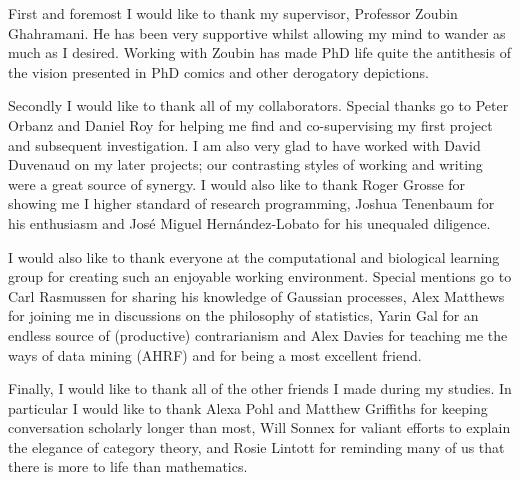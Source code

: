 
\begin{acknowledgements}      

First and foremost I would like to thank my supervisor, Professor Zoubin Ghahramani.
He has been very supportive whilst allowing my mind to wander as much as I desired.
Working with Zoubin has made PhD life quite the antithesis of the vision presented in PhD comics and other derogatory depictions.

Secondly I would like to thank all of my collaborators.
Special thanks go to Peter Orbanz and Daniel Roy for helping me find and co-supervising my first project and subsequent investigation.
I am also very glad to have worked with David Duvenaud on my later projects; our contrasting styles of working and writing were a great source of synergy.
I would also like to thank Roger Grosse for showing me I higher standard of research programming, Joshua Tenenbaum for his enthusiasm and Jos\'{e} Miguel Hern\'{a}ndez-Lobato for his unequaled diligence.

I would also like to thank everyone at the computational and biological learning group for creating such an enjoyable working environment.
Special mentions go to Carl Rasmussen for sharing his knowledge of Gaussian processes, Alex Matthews for joining me in discussions on the philosophy of statistics, Yarin Gal for an endless source of (productive) contrarianism and Alex Davies for teaching me the ways of data mining (AHRF) and for being a most excellent friend.

Finally, I would like to thank all of the other friends I made during my studies.
In particular I would like to thank Alexa Pohl and Matthew Griffiths for keeping conversation scholarly longer than most, Will Sonnex for valiant efforts to explain the elegance of category theory, and Rosie Lintott for reminding many of us that there is more to life than mathematics.

\end{acknowledgements}

